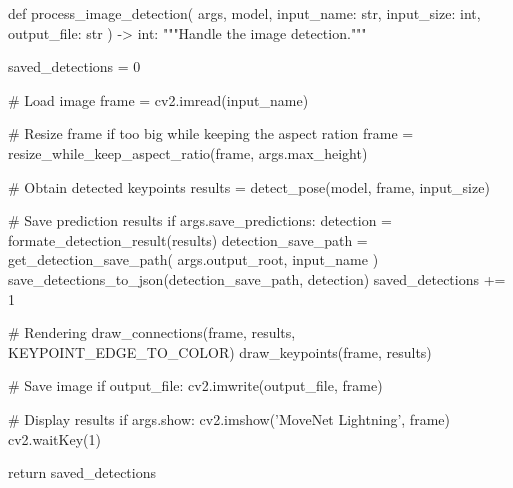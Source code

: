 \startPY
def process_image_detection(
        args,
        model,
        input_name: str,
        input_size: int,
        output_file: str
        ) -> int:
        """Handle the image detection."""

        saved_detections = 0

        # Load image
        frame = cv2.imread(input_name)

        # Resize frame if too big while keeping the aspect ration
        frame = resize_while_keep_aspect_ratio(frame, args.max_height)

        # Obtain detected keypoints
        results = detect_pose(model, frame, input_size)

        # Save prediction results
        if args.save_predictions:
                detection = formate_detection_result(results)
                detection_save_path = get_detection_save_path(
                        args.output_root,
                        input_name
                )
                save_detections_to_json(detection_save_path, detection)
                saved_detections += 1

        # Rendering
        draw_connections(frame, results, KEYPOINT_EDGE_TO_COLOR)
        draw_keypoints(frame, results)

        # Save image
        if output_file:
                cv2.imwrite(output_file, frame)

        # Display results
        if args.show:
            cv2.imshow('MoveNet Lightning', frame)
            cv2.waitKey(1)

        return saved_detections
\stopPY
\stopbuffer